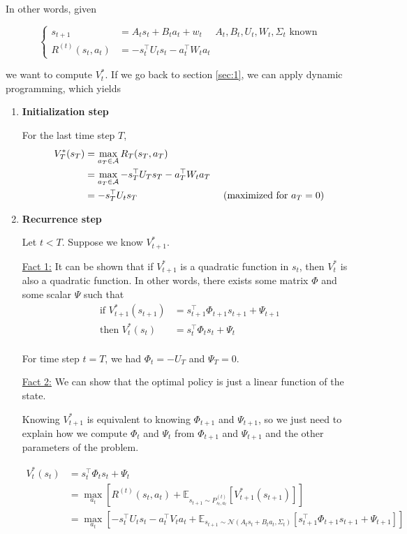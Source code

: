 \documentclass{article}
\begin{document}
In other words, given

\[ \begin{cases}
	 s_{t+1} &= A_t s_t + B_t a_t + w_t  \ \ \ \ \ \ A_t, B_t, U_t, W_t, \Sigma_t \text{ known }\\
	 R^{(t)}(s_t, a_t)& = - s_t^\top U_t s_t - a_t^\top W_t a_t 
\end{cases} \]


we want to compute $ V_t^* $. If we go back to section \ref{sec:1}, we can apply dynamic programming, which yields

\begin{enumerate}
	\item \textbf{Initialization step}
	
	For the last time step $ T $, 
	\begin{align*}
		V_T^{*} (s_T) &= \max_{a_T \in \mathcal{A}} R_T(s_T, a_T) \\
		&= \max_{a_T \in \mathcal{A}} - s_T^\top U_T s_T - a_T^\top W_t a_T\\
		&= - s_T^\top U_t s_T & \text{ (maximized for $ a_T = 0 $)}
	\end{align*}
	\item \textbf{Recurrence step} 
	
	Let $ t < T $. Suppose we know $ V^*_{t+1} $.
	
	\underline{Fact 1:} It can be shown that if $ V_{t+1}^* $ is a quadratic function in $ s_t $, then $ V_{t}^* $ is also a quadratic function. In other words, there exists some matrix $ \Phi $ and some scalar $ \Psi $ such that
	\begin{align*}
		 \text{if } V_{t+1}^*(s_{t+1}) &= s_{t+1}^\top \Phi_{t+1} s_{t+1} + \Psi_{t+1}\\
		 \text{then } V_{t}^* (s_t) &= s_{t}^\top \Phi_{t} s_{t} + \Psi_{t}\\
	\end{align*}
	
	For time step $ t = T $, we had $ \Phi_t = - U_T $ and $ \Psi_T = 0 $.
	
	\underline{Fact 2:} We can show that the optimal policy is just a linear function of the state.
	
	Knowing $ V^*_{t+1} $ is equivalent to knowing $ \Phi_{t+1} $ and $ \Psi_{t+1} $, so we just need to explain how we compute $ \Phi_t $ and $ \Psi_t $  from $ \Phi_{t+1} $ and $ \Psi_{t+1} $  and the other parameters of the problem. 
	
	\begin{align*}
		V_{t}^*(s_t) &= s_{t}^\top \Phi_{t} s_{t} + \Psi_{t}\\
		&= \max_{a_t} \left[R^{(t)}(s_t, a_t) + \mathbb{E}_{s_{t+1} \sim P^{(t)}_{s_t, a_t} } [ V_{t+1}^* (s_{t+1} ) ] \right]\\
		&= \max_{a_t} \left[- s_t^\top U_t s_t - a_t^\top V_t a_t  + \mathbb{E}_{s_{t+1} \sim \mathcal{N}\left(A_t s_t + B_t a_t, \Sigma_t \right) } [ s_{t+1}^\top \Phi_{t+1} s_{t+1} + \Psi_{t+1} ] \right]
	\end{align*}
	 

\end{enumerate}
\end{document}
